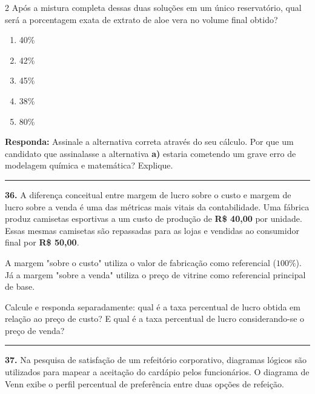 \documentclass[twoside, 10pt, a4paper]{article}
\newlength{\espacoPreQuestao}
\newlength{\espacoQuestao}
\begin{document}
\begin{multicols*}{2}
Após a mistura completa dessas duas soluções em um único reservatório, qual será a porcentagem exata de extrato de aloe vera no volume final obtido?
\begin{enumerate}[label=\alph*)]
    \item 40\%
    \item 42\%
    \item 45\%
    \item 38\%
    \item 80\%
\end{enumerate}
\begin{boxresponda}
\textbf{Responda:} Assinale a alternativa correta através do seu cálculo. Por que um candidato que assinalasse a alternativa \textbf{a)} estaria cometendo um grave erro de modelagem química e matemática? Explique.
\end{boxresponda}
\par\vspace{\espacoQuestao}

\noindent\textcolor{CorLinha}{\rule{\linewidth}{0.5pt}} 
\par\vspace{\espacoPreQuestao}
\textbf{36.} A diferença conceitual entre margem de lucro sobre o custo e margem de lucro sobre a venda é uma das métricas mais vitais da contabilidade. Uma fábrica produz camisetas esportivas a um custo de produção de \textbf{R\$ 40,00} por unidade. Essas mesmas camisetas são repassadas para as lojas e vendidas ao consumidor final por \textbf{R\$ 50,00}.
\begin{boxdica}
A margem "sobre o custo" utiliza o valor de fabricação como referencial ($ 100\% $). Já a margem "sobre a venda" utiliza o preço de vitrine como referencial principal de base.
\end{boxdica}
Calcule e responda separadamente: qual é a taxa percentual de lucro obtida em relação ao preço de custo? E qual é a taxa percentual de lucro considerando-se o preço de venda?
\par\vspace{\espacoQuestao}

\noindent\textcolor{CorLinha}{\rule{\linewidth}{0.5pt}} 
\par\vspace{\espacoPreQuestao}
\textbf{37.} Na pesquisa de satisfação de um refeitório corporativo, diagramas lógicos são utilizados para mapear a aceitação do cardápio pelos funcionários. O diagrama de Venn exibe o perfil percentual de preferência entre duas opções de refeição.


\end{multicols*}
\end{document}
